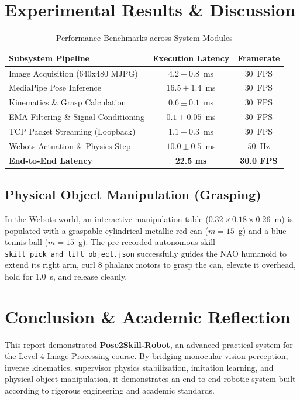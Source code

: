 \documentclass[conference,10pt,twocolumn]{IEEEtran}
\begin{document}
\section{Experimental Results \& Discussion}

\begin{table}[htbp]
\caption{Performance Benchmarks across System Modules}
\label{tab:perf}
\centering
\begin{tabular}{lcc}
\toprule
\textbf{Subsystem Pipeline} & \textbf{Execution Latency} & \textbf{Framerate} \\
\midrule
Image Acquisition (640x480 MJPG) & $4.2 \pm 0.8$~ms & $30$~FPS \\
MediaPipe Pose Inference & $16.5 \pm 1.4$~ms & $30$~FPS \\
Kinematics \& Grasp Calculation & $0.6 \pm 0.1$~ms & $30$~FPS \\
EMA Filtering \& Signal Conditioning & $0.1 \pm 0.05$~ms & $30$~FPS \\
TCP Packet Streaming (Loopback) & $1.1 \pm 0.3$~ms & $30$~FPS \\
Webots Actuation \& Physics Step & $10.0 \pm 0.5$~ms & $50$~Hz \\
\midrule
\textbf{End-to-End Latency} & \textbf{22.5 ms} & \textbf{30.0 FPS} \\
\bottomrule
\end{tabular}
\end{table}

\subsection{Physical Object Manipulation (Grasping)}
In the Webots world, an interactive manipulation table ($0.32 \times 0.18 \times 0.26$~m) is populated with a graspable cylindrical metallic red can ($m=15$~g) and a blue tennis ball ($m=15$~g). The pre-recorded autonomous skill \texttt{skill\_pick\_and\_lift\_object.json} successfully guides the NAO humanoid to extend its right arm, curl 8 phalanx motors to grasp the can, elevate it overhead, hold for 1.0~s, and release cleanly.

\section{Conclusion \& Academic Reflection}
This report demonstrated \textbf{Pose2Skill-Robot}, an advanced practical system for the Level 4 Image Processing course. By bridging monocular vision perception, inverse kinematics, supervisor physics stabilization, imitation learning, and physical object manipulation, it demonstrates an end-to-end robotic system built according to rigorous engineering and academic standards.
\end{document}
